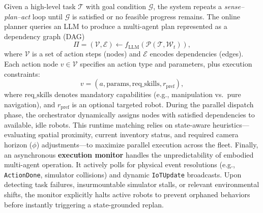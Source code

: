 Given a high-level task $\mathcal{T}$ with goal condition $\mathcal{G}$, the system repeats a \emph{sense--plan--act} loop until $\mathcal{G}$ is satisfied or no feasible progress remains. The online planner queries an LLM to produce a multi-agent plan represented as a dependency graph (DAG)
\begin{equation}
\label{eq:planning}
\Pi = (\mathcal{V}, \mathcal{E}) \gets f_{\text{LLM}}(\mathcal{P}(\mathcal{T}, \mathcal{W}_t)),
\end{equation}
where $\mathcal{V}$ is a set of action steps (nodes) and $\mathcal{E}$ encodes dependencies (edges). Each action node $v\in\mathcal{V}$ specifies an action type and parameters, plus execution constraints:
\begin{equation}
\label{eq:action_node}
v = (a, \text{params}, \text{req\_skills}, r_{\text{pref}}),
\end{equation}
where $\text{req\_skills}$ denotes mandatory capabilities (e.g., manipulation vs.\ pure navigation), and $r_{\text{pref}}$ is an optional targeted robot. During the parallel dispatch phase, the orchestrator dynamically assigns nodes with satisfied dependencies to available, idle robots. This runtime matching relies on state-aware heuristics—evaluating spatial proximity, current inventory status, and required camera horizon ($\phi$) adjustments—to maximize parallel execution across the fleet. Finally, an asynchronous \textbf{execution monitor} handles the unpredictability of embodied multi-agent operation. It actively polls for physical event resolutions (e.g., \texttt{ActionDone}, simulator collisions) and dynamic \texttt{IoTUpdate} broadcasts. Upon detecting task failures, insurmountable simulator stalls, or relevant environmental shifts, the monitor explicitly halts active robots to prevent orphaned behaviors before instantly triggering a state-grounded replan.


